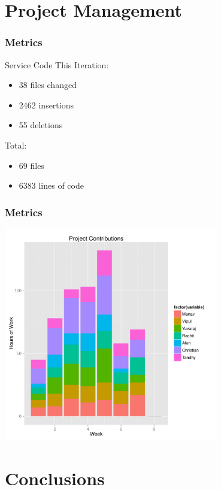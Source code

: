 \documentclass[final]{beamer}
\begin{document}
\section{Project Management}

\begin{frame}
	\frametitle{Metrics}
	\begin{beamerboxesrounded}[shadow]{Service Code}
		This Iteration:
		\begin{itemize}
			\item{38 files changed}
			\item{2462 insertions}
			\item{55 deletions}
		\end{itemize}

		Total:
		\begin{itemize}
			\item{69 files}
			\item{6383 lines of code}
		\end{itemize}
	\end{beamerboxesrounded}
\end{frame}

\begin{frame}
	\frametitle{Metrics}
	\includegraphics[width = 0.7\textwidth]{./hours_worked}
\end{frame}

\section{Conclusions}
\end{document}
